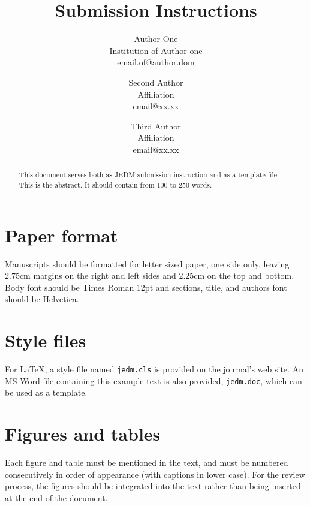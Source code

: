\documentclass[notitlepage,12pt]{jedm}
\begin{document}
\title{Submission Instructions}
\date{} %

\author{{\large Author One}\\Institution of Author one\\email.of@author.dom \and {\large Second Author}\\Affiliation\\email@xx.xx  \and {\large Third Author}\\Affiliation\\email@xx.xx }

\maketitle

\begin{abstract}
This document serves both as JEDM submission instruction and as a template file.  This is the abstract. It should contain from 100 to 250 words.
\end{abstract}


\section{Paper format}

Manuscripts should be formatted for letter sized paper, one side only, leaving 2.75cm margins on the right and left sides and 2.25cm on the top and bottom. Body font should be Times Roman 12pt and sections, title, and authors font should be Helvetica.

\section{Style files}

For LaTeX, a style file named \texttt{jedm.cls} is provided on the journal's web site.  An MS Word file containing this example text is also provided, \texttt{jedm.doc}, which can be used as a template.

\section{Figures and tables}

Each figure and table must be mentioned in the text, and must be numbered consecutively in order of appearance (with captions in lower case). For the review process, the figures should be integrated into the text rather than being inserted at the end of the document.
\end{document}
